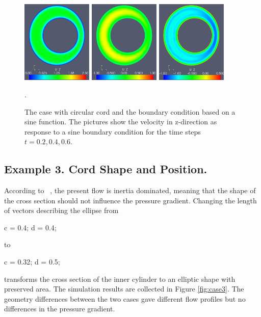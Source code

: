 \begin{figure}\begin{center}
\includegraphics[width=0.3\textwidth]{chapters/hentschel/pdf/sin_sysmax_nmb2.pdf}
\includegraphics[width=0.3\textwidth]{chapters/hentschel/pdf/sin_sysdia_nmb4.pdf}
\includegraphics[width=0.3\textwidth]{chapters/hentschel/pdf/sin_diamin_nmb6.pdf}
\caption{The case with circular cord and the boundary condition based on a
    sine function. The pictures show the velocity in z-direction as response to a sine boundary condition for the time steps $t=0.2, 0.4, 0.6$.}
\label{fig:case2}.
\end{center}\end{figure}





\subsection{Example 3. Cord Shape and Position.}

According to ~\cite{LothYardimciAlperin2001,AlperinMazdaLichtorEtAl2006}, the present flow is inertia dominated, meaning that the shape of the cross section should not influence the pressure gradient. Changing the length of vectors describing the ellipse from
\begin{bash}
c = 0.4;
d = 0.4;
\end{bash}
to
\begin{bash}
c = 0.32;
d = 0.5;
\end{bash}
transforms the cross section of the inner cylinder to an elliptic shape with preserved area. The simulation results are collected in Figure \ref{fig:case3}. The geometry differences between the two cases gave different flow profiles but no differences in the pressure gradient.


